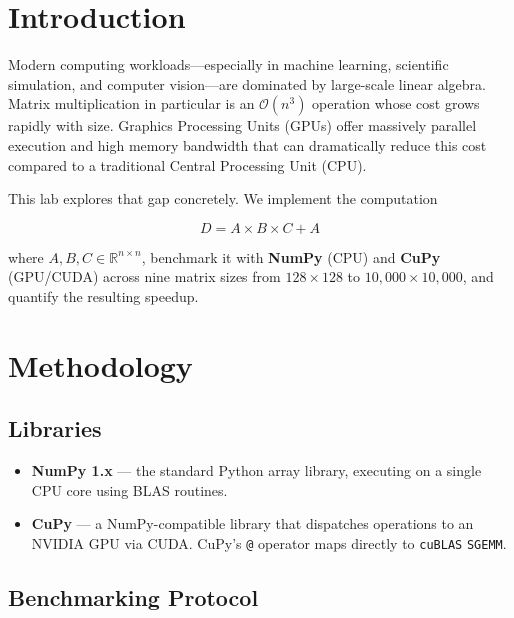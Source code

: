 \documentclass[12pt, a4paper]{article}
\begin{document}
\section{Introduction}

Modern computing workloads---especially in machine learning, scientific simulation, and computer vision---are dominated by large-scale linear algebra. Matrix multiplication in particular is an $\mathcal{O}(n^3)$ operation whose cost grows rapidly with size. Graphics Processing Units (GPUs) offer massively parallel execution and high memory bandwidth that can dramatically reduce this cost compared to a traditional Central Processing Unit (CPU).

This lab explores that gap concretely. We implement the computation

\[
  D = A \times B \times C + A
\]

where $A, B, C \in \mathbb{R}^{n \times n}$, benchmark it with \textbf{NumPy} (CPU) and \textbf{CuPy} (GPU/CUDA) across nine matrix sizes from $128 \times 128$ to $10{,}000 \times 10{,}000$, and quantify the resulting speedup.

\section{Methodology}

\subsection{Libraries}

\begin{itemize}[leftmargin=1.4em, itemsep=3pt]
  \item \textbf{NumPy 1.x} --- the standard Python array library, executing on a single CPU core using BLAS routines.
  \item \textbf{CuPy} --- a NumPy-compatible library that dispatches operations to an NVIDIA GPU via CUDA.  CuPy's \texttt{@} operator maps directly to \texttt{cuBLAS} \texttt{SGEMM}.
\end{itemize}

\subsection{Benchmarking Protocol}
\end{document}
